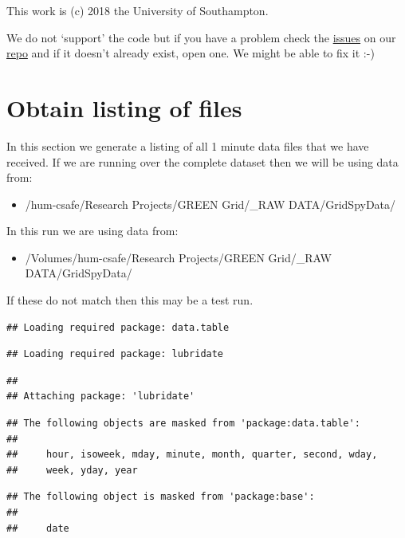 \documentclass[]{article}
\providecommand{\tightlist}{%
  \setlength{\itemsep}{0pt}\setlength{\parskip}{0pt}}
\begin{document}
This work is (c) 2018 the University of Southampton.

We do not `support' the code but if you have a problem check the
\href{https://git.soton.ac.uk/ba1e12/nzGREENGrid/issues}{issues} on our
\href{https://git.soton.ac.uk/ba1e12/nzGREENGrid}{repo} and if it
doesn't already exist, open one. We might be able to fix it :-)

\section{Obtain listing of files}\label{obtain-listing-of-files}

In this section we generate a listing of all 1 minute data files that we
have received. If we are running over the complete dataset then we will
be using data from:

\begin{itemize}
\tightlist
\item
  /hum-csafe/Research Projects/GREEN Grid/\_RAW DATA/GridSpyData/
\end{itemize}

In this run we are using data from:

\begin{itemize}
\tightlist
\item
  /Volumes/hum-csafe/Research Projects/GREEN Grid/\_RAW
  DATA/GridSpyData/
\end{itemize}

If these do not match then this may be a test run.

\begin{verbatim}
## Loading required package: data.table
\end{verbatim}

\begin{verbatim}
## Loading required package: lubridate
\end{verbatim}

\begin{verbatim}
## 
## Attaching package: 'lubridate'
\end{verbatim}

\begin{verbatim}
## The following objects are masked from 'package:data.table':
## 
##     hour, isoweek, mday, minute, month, quarter, second, wday,
##     week, yday, year
\end{verbatim}

\begin{verbatim}
## The following object is masked from 'package:base':
## 
##     date
\end{verbatim}
\end{document}
